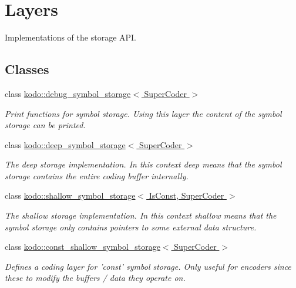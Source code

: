 \hypertarget{group__symbol__storage__layers}{\section{Layers}
\label{group__symbol__storage__layers}
}


Implementations of the storage A\-P\-I.  


\subsection*{Classes}
\begin{DoxyCompactItemize}
\item 
class \hyperlink{classkodo_1_1debug__symbol__storage}{kodo\-::debug\-\_\-symbol\-\_\-storage$<$ Super\-Coder $>$}
\begin{DoxyCompactList}\small\item\em Print functions for symbol storage. Using this layer the content of the symbol storage can be printed. \end{DoxyCompactList}\item 
class \hyperlink{classkodo_1_1deep__symbol__storage}{kodo\-::deep\-\_\-symbol\-\_\-storage$<$ Super\-Coder $>$}
\begin{DoxyCompactList}\small\item\em The deep storage implementation. In this context deep means that the symbol storage contains the entire coding buffer internally. \end{DoxyCompactList}\item 
class \hyperlink{classkodo_1_1shallow__symbol__storage}{kodo\-::shallow\-\_\-symbol\-\_\-storage$<$ Is\-Const, Super\-Coder $>$}
\begin{DoxyCompactList}\small\item\em The shallow storage implementation. In this context shallow means that the symbol storage only contains pointers to some external data structure. \end{DoxyCompactList}\item 
class \hyperlink{classkodo_1_1const__shallow__symbol__storage}{kodo\-::const\-\_\-shallow\-\_\-symbol\-\_\-storage$<$ Super\-Coder $>$}
\begin{DoxyCompactList}\small\item\em Defines a coding layer for 'const' symbol storage. Only useful for encoders since these to modify the buffers / data they operate on. \end{DoxyCompactList}\item 

\end{DoxyCompactItemize}
